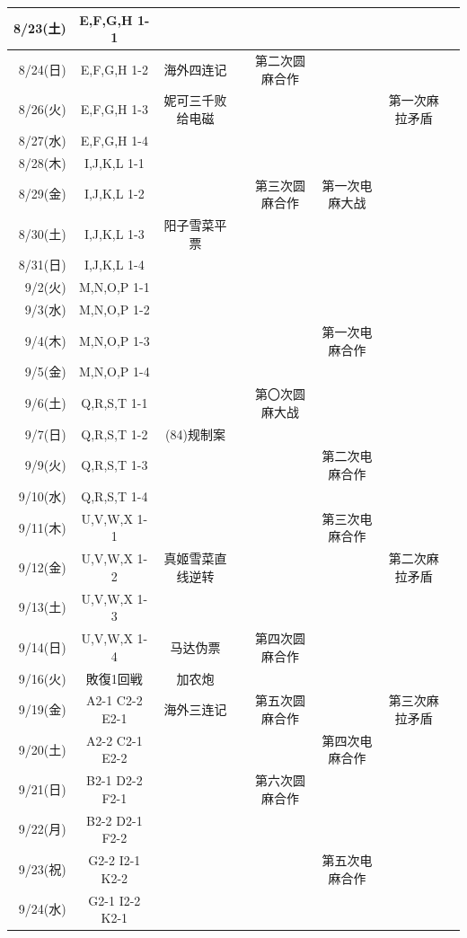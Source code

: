 {\begin{longtable}{rccccccc}
	8/23(土) & E,F,G,H 1-1 &  &  &  &  &\\ \hline
	8/24(日) & E,F,G,H 1-2 & 海外四连记 &  & 第二次圆麻合作 &  &\\ \hline
	8/26(火) & E,F,G,H 1-3 & 妮可三千败给电磁 &  &  &  & 第一次麻拉矛盾\\ \hline
	8/27(水) & E,F,G,H 1-4 &  &  &  &  &\\ \hline
	8/28(木) & I,J,K,L 1-1 &  &  &  &  &\\ \hline
	8/29(金) & I,J,K,L 1-2 &  &  & 第三次圆麻合作 & 第一次电麻大战 &\\ \hline
	8/30(土) & I,J,K,L 1-3 & 阳子雪菜平票 &  &  &  &\\ \hline
	8/31(日) & I,J,K,L 1-4 &  &  &  &  &\\ \hline
	9/2(火)  & M,N,O,P 1-1 &  &  &  &  &\\ \hline
	9/3(水)  & M,N,O,P 1-2 &  &  &  &  &\\ \hline
	9/4(木)  & M,N,O,P 1-3 &  &  &  & 第一次电麻合作 &\\ \hline
	9/5(金)  & M,N,O,P 1-4 &  &  &  &  &\\ \hline
	9/6(土)  & Q,R,S,T 1-1 &  &  & 第〇次圆麻大战 &  &\\ \hline
	9/7(日)  & Q,R,S,T 1-2 & (84)规制案 &  &  &  &\\ \hline
	9/9(火)  & Q,R,S,T 1-3 &  &  &  & 第二次电麻合作 &\\ \hline
	9/10(水) & Q,R,S,T 1-4 &  &  &  &  &\\ \hline
	9/11(木) & U,V,W,X 1-1 &  &  &  & 第三次电麻合作 &\\ \hline
	9/12(金) & U,V,W,X 1-2 & 真姬雪菜直线逆转 &  &  &  & 第二次麻拉矛盾\\ \hline
	9/13(土) & U,V,W,X 1-3 &  &  &  &  &\\ \hline
	9/14(日) & U,V,W,X 1-4 & 马达伪票 &  & 第四次圆麻合作 &  &\\ \hline
	9/16(火) & 敗復1回戦 & 加农炮 &  &  &  &\\ \hline
	9/19(金) & A2-1 C2-2 E2-1 & 海外三连记 &  & 第五次圆麻合作 &  & 第三次麻拉矛盾\\ \hline
	9/20(土) & A2-2 C2-1 E2-2 &  &  &  & 第四次电麻合作 &\\ \hline
	9/21(日) & B2-1 D2-2 F2-1 &  &  & 第六次圆麻合作 &  &\\ \hline
	9/22(月) & B2-2 D2-1 F2-2 &  &  &  &  &\\ \hline
	9/23(祝) & G2-2 I2-1 K2-2 &  &  &  & 第五次电麻合作 &\\ \hline
  9/24(水) & G2-1 I2-2 K2-1 &  &  &  &  &\\ \hline

\end{longtable}}
